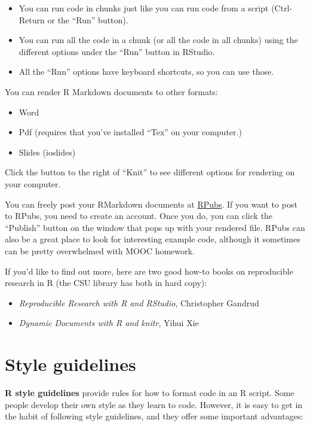 \documentclass[]{book}
\providecommand{\tightlist}{%
  \setlength{\itemsep}{0pt}\setlength{\parskip}{0pt}}
\theoremstyle{definition}
\theoremstyle{definition}
\theoremstyle{definition}
\theoremstyle{remark}
\begin{document}
\begin{itemize}
\tightlist
\item
  You can run code in chunks just like you can run code from a script
  (Ctrl-Return or the ``Run'' button).
\item
  You can run all the code in a chunk (or all the code in all chunks)
  using the different options under the ``Run'' button in RStudio.
\item
  All the ``Run'' options have keyboard shortcuts, so you can use those.
\end{itemize}

You can render R Markdown documents to other formats:

\begin{itemize}
\tightlist
\item
  Word
\item
  Pdf (requires that you've installed ``Tex'' on your computer.)
\item
  Slides (ioslides)
\end{itemize}

Click the button to the right of ``Knit'' to see different options for
rendering on your computer.

You can freely post your RMarkdown documents at
\href{http://rpubs.com}{RPubs}. If you want to post to RPubs, you need
to create an account. Once you do, you can click the ``Publish'' button
on the window that pops up with your rendered file. RPubs can also be a
great place to look for interesting example code, although it sometimes
can be pretty overwhelmed with MOOC homework.

If you'd like to find out more, here are two good how-to books on
reproducible research in R (the CSU library has both in hard copy):

\begin{itemize}
\tightlist
\item
  \emph{Reproducible Research with R and RStudio}, Christopher Gandrud
\item
  \emph{Dynamic Documents with R and knitr}, Yihui Xie
\end{itemize}

\section{Style guidelines}\label{style-guidelines}

\textbf{R style guidelines} provide rules for how to format code in an R
script. Some people develop their own style as they learn to code.
However, it is easy to get in the habit of following style guidelines,
and they offer some important advantages:
\end{document}
